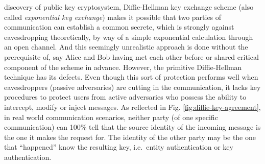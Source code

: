\documentclass[12pt,journal,compsoc]{IEEEtran}
\begin{document}
discovery of public key cryptosystem, Diffie-Hellman key exchange
scheme (also called \emph{exponential key exchange}) makes it possible
that two parties of communication can establish a common secrete,
which is strongly against eavesdropping theoretically, by way of a
simple exponential calculation through an open channel. And this
seemingly unrealistic approach is done without the prerequisite of,
say Alice and Bob having met each other before or shared critical
component of the scheme in advance. However, the primitive
Diffie-Hellman technique has its defects. Even though this sort of
protection performs well when eavesdroppers (passive adversaries) are
cutting in the communication, it lacks key procedures to protect users
from active adversaries who possess the ability to intercept, modify
or inject messages. As reflected in Fig.
\ref{fig:diffie-key-agreement},  in real world communication scenarios,
neither party (of one specific communication) can 100\% tell that the
source identity of the incoming message is the one it makes the
request for. The identity of the other party may be the one that
``happened'' know the resulting key, i.e.\ entity
authentication or key authentication.
\end{document}
